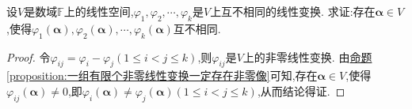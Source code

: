 \documentclass[../../main.tex]{subfiles}%
\begin{document}
\begin{proposition}\label{proposition:一组有限个非零线性变换一定存在互不相同的像}
设\(V\)是数域\(\mathbb{F}\)上的线性空间,\(\varphi_1,\varphi_2,\cdots,\varphi_k\)是\(V\)上互不相同的线性变换. 求证:存在\(\boldsymbol{\alpha}\in V\),使得\(\varphi_1(\boldsymbol{\alpha}),\varphi_2(\boldsymbol{\alpha}),\cdots,\varphi_k(\boldsymbol{\alpha})\)互不相同.
\end{proposition}
\begin{proof}
令\(\varphi_{ij}=\varphi_i - \varphi_j(1\leqslant  i<j\leqslant  k)\),则\(\varphi_{ij}\)是\(V\)上的非零线性变换. 由\hyperref[proposition:一组有限个非零线性变换一定存在非零像]{命题\ref{proposition:一组有限个非零线性变换一定存在非零像}}可知,存在\(\boldsymbol{\alpha}\in V\),使得\(\varphi_{ij}(\boldsymbol{\alpha})\neq 0\),即\(\varphi_i(\boldsymbol{\alpha})\neq\varphi_j(\boldsymbol{\alpha})(1\leqslant  i<j\leqslant  k)\),从而结论得证. 
\end{proof}
\end{document}
